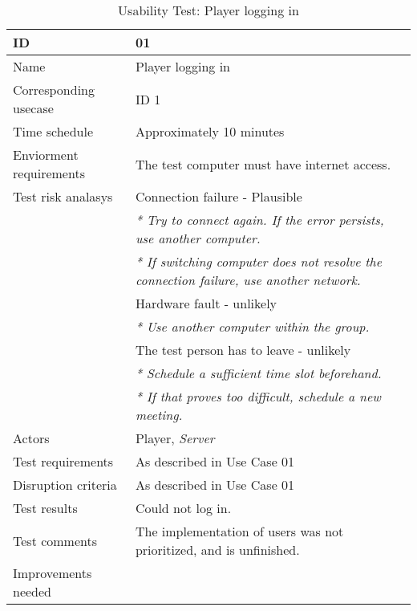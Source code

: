 
{\footnotesize
\begin{table}[H]
\begin{tabular}{| p{5cm} | p{10cm} |}\hline
	\textbf{ID}	& \textbf{01} \\ \hline
	Name		& Player logging in\\ \hline
	Corresponding usecase & ID 1\\ \hline
	Time schedule	& Approximately 10 minutes\\ \hline
	Enviorment requirements 
		& The test computer must have internet access. \\ \hline
	Test risk analasys 
		& Connection failure - Plausible \\
		& \emph{* Try to connect again. If the error persists, use another computer.} \\
		& \emph{* If switching computer does not resolve the connection failure, use another network.}\\
		& Hardware fault - unlikely \\
		& \emph{* Use another computer within the group.} \\
		& The test person has to leave - unlikely \\
		& \emph{* Schedule a sufficient time slot beforehand.} \\
		& \emph{* If that proves too difficult, schedule a new meeting.}\\ \hline
	Actors	& Player, \emph{Server}\\ \hline
	Test requirements & As described in Use Case 01 \\ \hline
	Disruption criteria & As described in Use Case 01  \\ \hline
	Test results & Could not log in.\\ \hline
	Test comments & The implementation of users was not prioritized, and is unfinished. \\ \hline
	Improvements needed & \\ \hline
\end{tabular}


\caption{Usability Test: Player logging in}
\label{fig:usability_test_1}
\end{table}}


